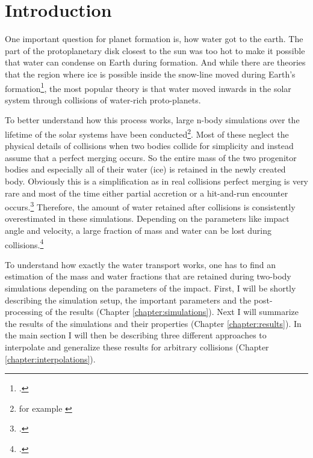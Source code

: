 \chapter{Introduction}\label{introduction}

One important question for planet formation is, how water got to the earth. The part of the protoplanetary disk closest to the sun was too hot to make it possible that water can condense on Earth during formation. And while there are theories that the region where ice is possible inside the snow-line moved during Earth's formation\footcite{snowline}, the most popular theory is that water moved inwards in the solar system through collisions of water-rich proto-planets.%



To better understand how this process works, large n-body simulations over the lifetime of the solar systems have been conducted\footnote{for example \cite{dvorakSimulation}}. Most of these neglect the physical details of collisions when two bodies collide for simplicity and instead assume that a perfect merging occurs. So the entire mass of the two progenitor bodies and especially all of their water (ice) is retained in the newly created body. Obviously this is a simplification as in real collisions perfect merging is very rare and most of the time either partial accretion or a hit-and-run encounter occurs.\footcite{CollisionTypes} Therefore, the amount of water retained after collisions is consistently overestimated in these simulations. Depending on the parameters like impact angle and velocity, a large fraction of mass and water can be lost during collisions.\footcite{MaindlSummary}


To understand how exactly the water transport works, one has to find an estimation of the mass and water fractions that are retained during two-body simulations depending on the parameters of the impact.
First, I will be shortly describing the simulation setup, the important parameters and the post-processing of the results (Chapter \ref{chapter:simulations}). Next I will summarize the results of the simulations and their properties (Chapter \ref{chapter:results}). In the main section I will then be describing three different approaches to interpolate and generalize these results for arbitrary collisions (Chapter \ref{chapter:interpolations}). 
